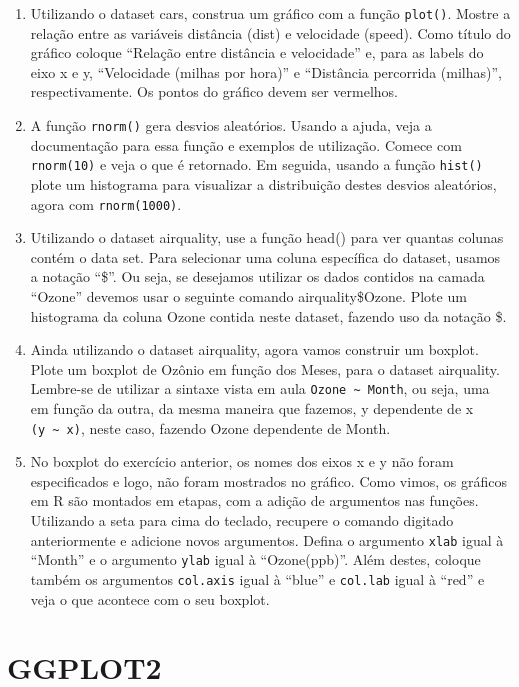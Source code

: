 \documentclass[
]{book}
\begin{document}
\begin{enumerate}
\def\labelenumi{\arabic{enumi}.}
\item
  Utilizando o dataset cars, construa um gráfico com a função \texttt{plot()}. Mostre a
  relação entre as variáveis distância (dist) e velocidade (speed). Como título do gráfico coloque ``Relação entre distância e velocidade'' e, para as labels do eixo x e y, ``Velocidade (milhas por hora)'' e ``Distância percorrida (milhas)'', respectivamente. Os pontos do gráfico devem ser vermelhos.
\item
  A função \texttt{rnorm()} gera desvios aleatórios. Usando a ajuda, veja a documentação para essa função e exemplos de utilização. Comece com \texttt{rnorm(10)} e veja o que é retornado. Em seguida, usando a função \texttt{hist()} plote um histograma para visualizar a distribuição destes desvios aleatórios, agora com \texttt{rnorm(1000)}.
\item
  Utilizando o dataset airquality, use a função head() para ver quantas colunas
  contém o data set. Para selecionar uma coluna específica do dataset, usamos a notação ``\$''. Ou seja, se desejamos utilizar os dados contidos na camada ``Ozone'' devemos usar o seguinte comando airquality\$Ozone. Plote um histograma da coluna Ozone contida neste dataset, fazendo uso da notação \$.
\item
  Ainda utilizando o dataset airquality, agora vamos construir um boxplot. Plote um boxplot de Ozônio em função dos Meses, para o dataset airquality. Lembre-se de utilizar a sintaxe vista em aula \texttt{Ozone\ \textasciitilde{}\ Month}, ou seja, uma em função da outra, da mesma maneira que fazemos, y dependente de x \texttt{(y\ \textasciitilde{}\ x)}, neste caso, fazendo Ozone dependente de Month.
\item
  No boxplot do exercício anterior, os nomes dos eixos x e y não foram especificados e logo, não foram mostrados no gráfico. Como vimos, os gráficos em R são montados em etapas, com a adição de argumentos nas funções. Utilizando a seta para cima do teclado, recupere o comando digitado anteriormente e adicione novos argumentos. Defina o argumento \texttt{xlab} igual à ``Month'' e o argumento \texttt{ylab} igual à ``Ozone(ppb)''. Além destes, coloque também os argumentos \texttt{col.axis} igual à ``blue'' e \texttt{col.lab} igual à ``red'' e veja o que acontece com o seu boxplot.
\end{enumerate}

\hypertarget{ggplot2}{%
\section{GGPLOT2}\label{ggplot2}}
\end{document}
